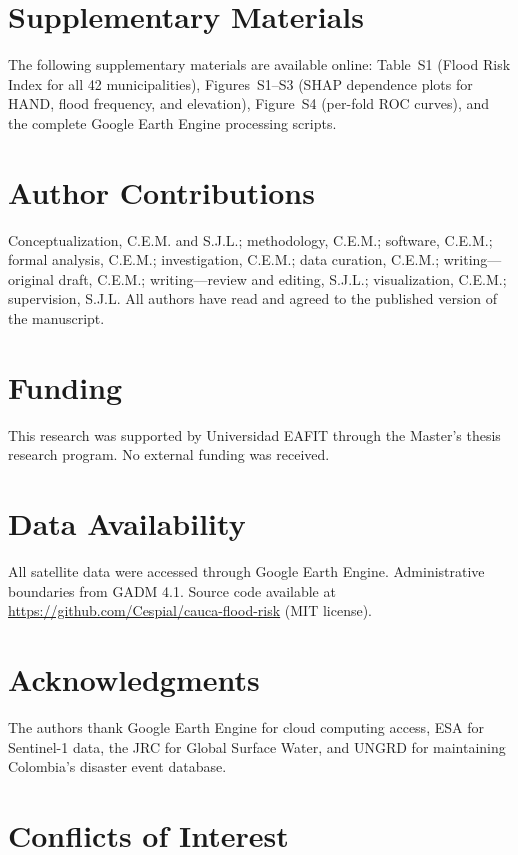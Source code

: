 \documentclass{article}
\begin{document}
\section*{Supplementary Materials}

The following supplementary materials are available online: Table~S1 (Flood Risk Index for all 42 municipalities), Figures~S1--S3 (SHAP dependence plots for HAND, flood frequency, and elevation), Figure~S4 (per-fold ROC curves), and the complete Google Earth Engine processing scripts.

\section*{Author Contributions}

Conceptualization, C.E.M. and S.J.L.; methodology, C.E.M.; software, C.E.M.; formal analysis, C.E.M.; investigation, C.E.M.; data curation, C.E.M.; writing---original draft, C.E.M.; writing---review and editing, S.J.L.; visualization, C.E.M.; supervision, S.J.L. All authors have read and agreed to the published version of the manuscript.

\section*{Funding}

This research was supported by Universidad EAFIT through the Master's thesis research program. No external funding was received.

\section*{Data Availability}

All satellite data were accessed through Google Earth Engine. Administrative boundaries from GADM 4.1. Source code available at \url{https://github.com/Cespial/cauca-flood-risk} (MIT license).

\section*{Acknowledgments}

The authors thank Google Earth Engine for cloud computing access, ESA for Sentinel-1 data, the JRC for Global Surface Water, and UNGRD for maintaining Colombia's disaster event database.

\section*{Conflicts of Interest}
\end{document}
